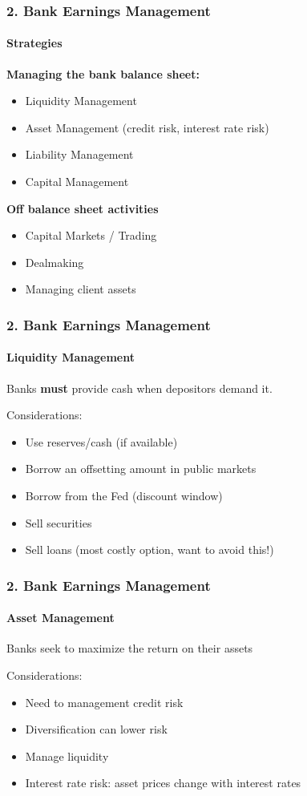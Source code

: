 \documentclass{beamer}
\begin{document}
\begin{frame}[t]
\frametitle{2. Bank Earnings Management}
\framesubtitle{Strategies}

    \textbf{Managing the bank balance sheet:}
    \begin{itemize}
        \item Liquidity Management
        \item Asset Management (credit risk, interest rate risk)
        \item Liability Management
        \item Capital Management
    \end{itemize}
    
    \textbf{Off balance sheet activities}
    \begin{itemize}
        \item Capital Markets / Trading
        \item Dealmaking
        \item Managing client assets
    \end{itemize}
\end{frame}

\begin{frame}[t]
\frametitle{2. Bank Earnings Management}
\framesubtitle{Liquidity Management}

    Banks \textbf{must} provide cash when depositors demand it.
    \vspace{1em}

    Considerations:
    \begin{itemize}
        \item Use reserves/cash (if available)
        \item Borrow an offsetting amount in public markets
        \item Borrow from the Fed (discount window)
        \item Sell securities
        \item Sell loans (most costly option, want to avoid this!)
    \end{itemize}

\end{frame}

\begin{frame}[t]
\frametitle{2. Bank Earnings Management}
\framesubtitle{Asset Management}

    Banks seek to maximize the return on their assets
    \vspace{1em}
    
    Considerations:
    \begin{itemize}
        \item Need to management credit risk
        \item Diversification can lower risk
        \item Manage liquidity
        \item Interest rate risk: asset prices change with interest rates
    \end{itemize}

\end{frame}
\end{document}
